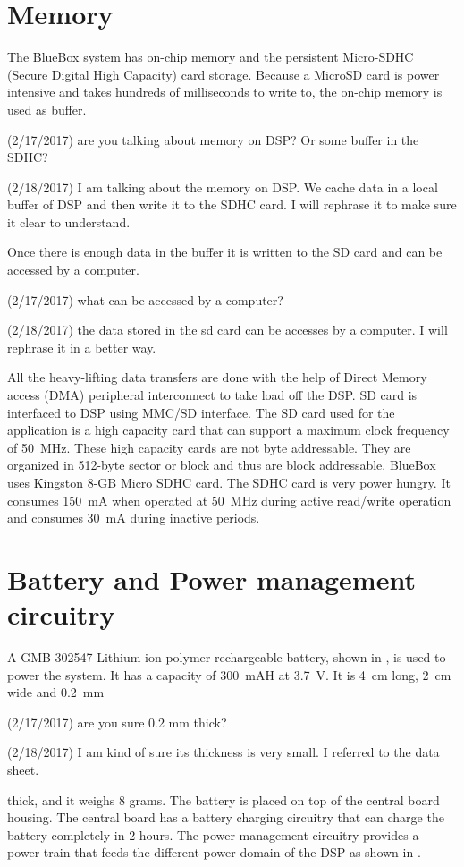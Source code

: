 \section{Memory}
\label{memory}

The BlueBox system has on-chip memory and the persistent Micro-SDHC
(Secure Digital High Capacity) card storage. Because a MicroSD
card is power intensive and takes hundreds of milliseconds to write
to, the on-chip memory is used as buffer.
\begin{cmtPai}
	(2/17/2017) are you talking about memory on DSP? Or some buffer in
	the SDHC?
\end{cmtPai}
\begin{cmtSMS}
	(2/18/2017) I am talking about the memory on DSP. We cache data in a local buffer of DSP and then write it to the SDHC card.
	I will rephrase it to make sure it clear to understand.
\end{cmtSMS}
Once there is enough data in the buffer it is written to the SD card
and can be accessed by a computer.
\begin{cmtPai}
	(2/17/2017) what can be accessed by a computer?
\end{cmtPai}
\begin{cmtSMS}
	(2/18/2017) the data stored in the sd card can be accesses by a computer. I will rephrase it in a better way.
\end{cmtSMS}
All the heavy-lifting data transfers are done with the help of Direct
Memory access (DMA) peripheral interconnect to take load off the DSP.
SD card is interfaced to DSP using MMC/SD interface. The SD card used
for the application is a high capacity card that can support a
maximum clock frequency of 50~MHz. These high capacity cards are not
byte addressable. They are organized in 512-byte sector or block and
thus are block addressable. BlueBox uses Kingston 8-GB Micro SDHC
card.  The SDHC card is very power hungry. It consumes 150~mA when
operated at 50~MHz during active read/write operation and consumes
30~mA during inactive periods.

\section{Battery and Power management circuitry}

A GMB 302547 Lithium ion polymer rechargeable battery, shown in
, is used to power the system. It has a
capacity of 300~mAH at 3.7~V. It is 4~cm long, 2~cm wide and 0.2~mm
\begin{cmtPai}
	(2/17/2017) are you sure 0.2 mm thick?
\end{cmtPai}
\begin{cmtSMS}
	(2/18/2017) I am kind of sure its thickness is very small. I referred to the data sheet. 
\end{cmtSMS}
thick, and it weighs 8 grams. The battery is placed on top of the
central board housing. The central board has a battery charging
circuitry that can charge the battery completely in 2 hours. The
power management circuitry provides a power-train that feeds the
different power domain of the DSP as shown in
.

